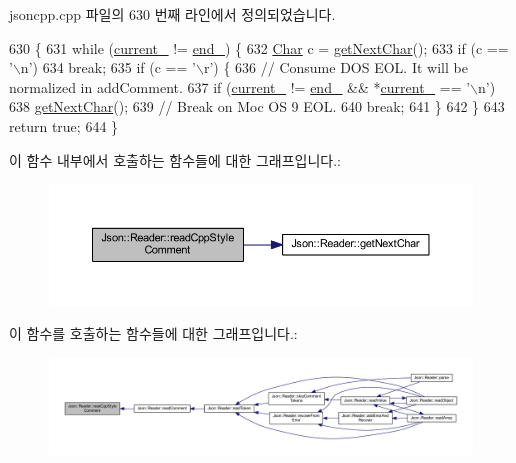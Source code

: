 jsoncpp.\+cpp 파일의 630 번째 라인에서 정의되었습니다.


\begin{DoxyCode}
630                                  \{
631   \textcolor{keywordflow}{while} (\hyperlink{class_json_1_1_reader_a2f2feb5201a26da7aa133d2f7434479b}{current\_} != \hyperlink{class_json_1_1_reader_a714793579cbf4ee7c5a7223d2c8d77c1}{end\_}) \{
632     \hyperlink{class_json_1_1_reader_a3eec9118f3e9a672ba8348c3a79d0f45}{Char} c = \hyperlink{class_json_1_1_reader_ab61eb61333cc9ec3afe785663a53ce90}{getNextChar}();
633     \textcolor{keywordflow}{if} (c == \textcolor{charliteral}{'\(\backslash\)n'})
634       \textcolor{keywordflow}{break};
635     \textcolor{keywordflow}{if} (c == \textcolor{charliteral}{'\(\backslash\)r'}) \{
636       \textcolor{comment}{// Consume DOS EOL. It will be normalized in addComment.}
637       \textcolor{keywordflow}{if} (\hyperlink{class_json_1_1_reader_a2f2feb5201a26da7aa133d2f7434479b}{current\_} != \hyperlink{class_json_1_1_reader_a714793579cbf4ee7c5a7223d2c8d77c1}{end\_} && *\hyperlink{class_json_1_1_reader_a2f2feb5201a26da7aa133d2f7434479b}{current\_} == \textcolor{charliteral}{'\(\backslash\)n'})
638         \hyperlink{class_json_1_1_reader_ab61eb61333cc9ec3afe785663a53ce90}{getNextChar}();
639       \textcolor{comment}{// Break on Moc OS 9 EOL.}
640       \textcolor{keywordflow}{break};
641     \}
642   \}
643   \textcolor{keywordflow}{return} \textcolor{keyword}{true};
644 \}
\end{DoxyCode}
이 함수 내부에서 호출하는 함수들에 대한 그래프입니다.\+:\nopagebreak
\begin{figure}[H]
\begin{center}
\leavevmode
\includegraphics[width=350pt]{class_json_1_1_reader_a6716ef6290b0f469efaf8d379c357967_cgraph}
\end{center}
\end{figure}
이 함수를 호출하는 함수들에 대한 그래프입니다.\+:\nopagebreak
\begin{figure}[H]
\begin{center}
\leavevmode
\includegraphics[width=350pt]{class_json_1_1_reader_a6716ef6290b0f469efaf8d379c357967_icgraph}
\end{center}
\end{figure}
\mbox{\label{class_json_1_1_reader_ae0ffe796abdc3c5851589ee500e28c79}} 
